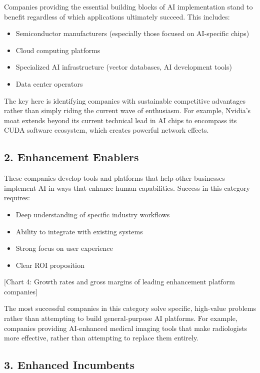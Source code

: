 \documentclass[
  Letterpaper,
]{scrbook}
\providecommand{\tightlist}{%
  \setlength{\itemsep}{0pt}\setlength{\parskip}{0pt}}\usepackage{longtable,booktabs,array}
\begin{document}
Companies providing the essential building blocks of AI implementation
stand to benefit regardless of which applications ultimately succeed.
This includes:

\begin{itemize}
\tightlist
\item
  Semiconductor manufacturers (especially those focused on AI-specific
  chips)
\item
  Cloud computing platforms
\item
  Specialized AI infrastructure (vector databases, AI development tools)
\item
  Data center operators
\end{itemize}

The key here is identifying companies with sustainable competitive
advantages rather than simply riding the current wave of enthusiasm. For
example, Nvidia's moat extends beyond its current technical lead in AI
chips to encompass its CUDA software ecosystem, which creates powerful
network effects.

\subsection{2. Enhancement Enablers}\label{enhancement-enablers}

These companies develop tools and platforms that help other businesses
implement AI in ways that enhance human capabilities. Success in this
category requires:

\begin{itemize}
\tightlist
\item
  Deep understanding of specific industry workflows
\item
  Ability to integrate with existing systems
\item
  Strong focus on user experience
\item
  Clear ROI proposition
\end{itemize}

{[}Chart 4: Growth rates and gross margins of leading enhancement
platform companies{]}

The most successful companies in this category solve specific,
high-value problems rather than attempting to build general-purpose AI
platforms. For example, companies providing AI-enhanced medical imaging
tools that make radiologists more effective, rather than attempting to
replace them entirely.

\subsection{3. Enhanced Incumbents}\label{enhanced-incumbents}
\end{document}
